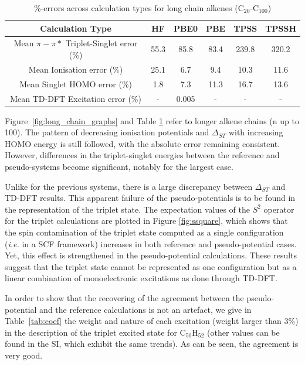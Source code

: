 \documentclass[journal=jctcce,manuscript=article]{achemso}
\begin{document}
\begin{table}[h]
\caption{\%-errors across calculation types for long chain alkenes (C\(_{20}\)-C\(_{100}\))}
\begin{tabular}{c c c c c c }
\hline
Calculation Type & HF & PBE0 & PBE & TPSS & TPSSH \\
\hline
Mean \(\pi - \pi*\) Triplet-Singlet error (\%) & 55.3 & 85.8 & 83.4 & 239.8 & 320.2 \\
Mean Ionisation error (\%) & 25.1 & 6.7 & 9.4 & 10.3 & 11.6 \\
Mean Singlet HOMO error (\%) & 1.8 & 7.3 & 11.3 & 16.7 & 13.6 \\
Mean TD-DFT Excitation error (\%) & - & 0.005 & - & - & - \\ 
\hline
\end{tabular}
\label{table:long_alkene_errors}
\end{table}

Figure~\ref{fig:long_chain_graphs} and Table \ref{table:long_alkene_errors} refer to longer 
alkene chains (n up to 100).
The pattern of decreasing ionisation potentials and $\Delta_{ST}$ with increasing HOMO
energy is still followed, with the absolute error remaining consistent.
However, differences in the triplet-singlet energies between the reference and pseudo-systems 
become significant, notably for the largest case.

Unlike for the previous systems, there is a large discrepancy between $\Delta_{ST}$
and TD-DFT results.
This apparent failure of the pseudo-potentials is to be found in the representation
of the triplet state. The expectation values of the $S^2$ operator for the triplet calculations
are plotted in Figure \ref{fig:ssquare}, which shows that the spin contamination
of the triplet state computed as a single configuration (\emph{i.e.} in a SCF
framework) increases in both reference and pseudo-potential cases.
Yet, this effect is strengthened in the pseudo-potential calculations.
These results suggest that the triplet state cannot be represented as one configuration
but as a linear combination of monoelectronic excitations as done through TD-DFT.

In order to show that the recovering of the agreement between the pseudo-potential
and the reference calculations is not an artefact, we give in Table~\ref{tab:coef}
the weight and nature of each excitation (weight larger than 3\%)
in the description of the triplet excited state for
C$_{50}$H$_{52}$ (other values can be found in the SI, which exhibit the same trends).
As can be seen, the agreement is very good. 
\end{document}
